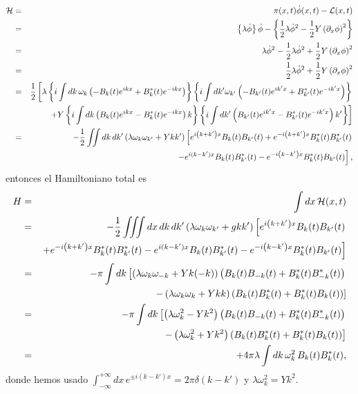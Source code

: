 \begin{eqnarray}
{\cal H} & = &\pi(x,t) \dot{\phi}(x,t) -{\cal L}(x,t) \\
& = &\left\{ \lambda\dot{\phi} \right\} \dot{\phi} -\left\{
\frac{1}{2}\lambda\dot{\phi}^{2} -\frac{1}{2}Y\left( \partial_{x}\phi\right)
^{2}\right\} \\
& = &\lambda\dot{\phi}^{2} -\frac{1}{2}\lambda\dot{\phi}^{2} +\frac{1}{2}Y\left(
\partial_{x}\phi\right) ^{2}\\
& = &\frac{1}{2}\lambda\dot{\phi}^{2} +\frac{1}{2}Y\left(\partial_{x}\phi\right)
^{2}\\
& = &\frac{1}{2}\left[\lambda\left\{ i\int dk\,\omega_k\left( -B_k(t)
e^{ikx}+B_k^{\ast}(t) e^{-ikx}\right) \right\} \left\{ i\int
dk'\omega_{k'}\left(-B_{k'}(t) e^{ik'x}+B_{k'}^{\ast}(t)
e^{-ik'x}\right) \right\}\right. \nonumber \\
&&\left.+Y\left\{ i\int dk\left( B_k(t) e^{ikx}-B_k^{\ast}(t) e^{-ikx}\right)
k\right\} \left\{ i\int dk'\left( B_{k'}(t)e^{ik'x}-B_{k'}^{\ast}(t)
e^{-ik'x}\right) k'\right\}\right] \\
& = &-\frac{1}{2}\iint dk\,dk'\left( \lambda\omega_k\omega_{k'}+Ykk'\right)
\left[e^{i\left( k+k' \right) x} B_k(t) B_{k'}(t)+e^{-i\left( k+k' \right)
x}B_k^{\ast}(t) B_{k'}^{\ast}(t)  \right.\nonumber \\
&&\left.-e^{i(k-k') x} B_k(t) B_{k'}^{\ast}(t)-e^{-i\left( k-k' \right)
x}B_k^{\ast}(t) B_{k'}(t) \right],
\end{eqnarray}
entonces el Hamiltoniano total es
\begin{eqnarray}
H & = &\int dx\, {\cal H}(x,t) \\
& = &-\frac{1}{2}\iiint dx\,dk\,dk'\left( \lambda\omega_k\omega_{k'}+gkk'\right)
\left[e^{i\left( k+k' \right) x} B_k(t) B_{k'}(t) \right.\nonumber \\
&&\left.+e^{-i\left( k+k' \right) x}B_k^{\ast}(t) B_{k'}^{\ast}(t) -e^{i(k-k')
x} B_k(t) B_{k'}^{\ast}(t)-e^{-i\left( k-k' \right) x}B_k^{\ast}(t) B_{k'}(t)
\right]\\
& = &-\pi\int dk\left[\left( \lambda\omega_k\omega_{-k}+Yk(-k)\right)\left(
B_k(t) B_{-k}(t)+B_k^{\ast}(t) B_{-k}^{\ast}(t) \right) \right.\nonumber \\
&&\left.-\left( \lambda\omega_k\omega_k+Ykk\right)\left( B_k(t)
B_k^{\ast}(t)+B_k^{\ast}(t) B_k(t) \right)\right]\\
& = &-\pi\int dk\left[\left( \lambda\omega_k^2-Yk^2\right)\left( B_k(t)
B_{-k}(t)+B_k^{\ast}(t) B_{-k}^{\ast}(t) \right) \right.\nonumber \\
&&\left.-\left( \lambda\omega_k^2+Yk^2\right)\left( B_k(t)
B_k^{\ast}(t)+B_k^{\ast}(t) B_k(t) \right)\right]\\
& = &+4\pi\lambda\int dk\, \omega_k^2\, B_k(t) B_k^{\ast}(t),
\end{eqnarray}
donde hemos usado $\int_{-\infty}^{+\infty} dx\,e^{\pm
i(k-k')x}=2\pi\delta\left(
k-k'\right)$  y $\lambda\omega_k^2=Yk^2$.

